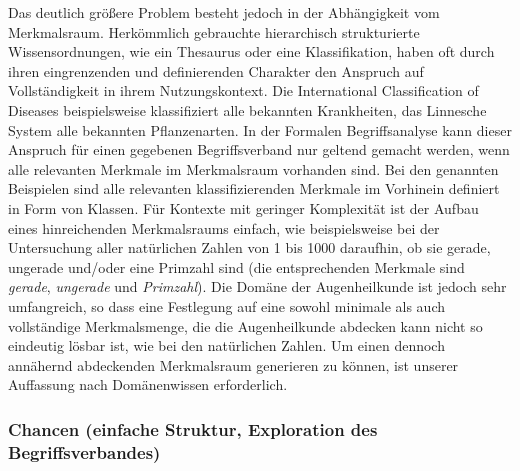 \documentclass[pagesize,DIV=calc,12pt,draft]{scrreprt}
\begin{document}
Das deutlich größere Problem besteht jedoch in der Abhängigkeit vom Merkmalsraum. 
Herkömmlich gebrauchte hierarchisch strukturierte Wissensordnungen, wie ein Thesaurus oder eine Klassifikation, haben oft durch ihren eingrenzenden und definierenden Charakter den Anspruch auf Vollständigkeit in ihrem Nutzungskontext. 
Die International Classification of Diseases beispielsweise klassifiziert alle bekannten Krankheiten, das Linnesche System alle bekannten Pflanzenarten. 
In der Formalen Begriffsanalyse kann dieser Anspruch für einen gegebenen Begriffsverband nur geltend gemacht werden, wenn alle relevanten Merkmale im Merkmalsraum vorhanden sind. 
Bei den genannten Beispielen sind alle relevanten klassifizierenden Merkmale im Vorhinein definiert in Form von Klassen. 
Für Kontexte mit geringer Komplexität ist der Aufbau eines hinreichenden Merkmalsraums einfach, wie beispielsweise bei der Untersuchung aller natürlichen Zahlen von 1 bis 1000 daraufhin, ob sie gerade, ungerade und/oder eine Primzahl sind (die entsprechenden Merkmale sind \emph{gerade}, \emph{ungerade} und \emph{Primzahl}).
Die Domäne der Augenheilkunde ist jedoch sehr umfangreich, so dass eine Festlegung auf eine sowohl minimale als auch vollständige Merkmalsmenge, die die Augenheilkunde abdecken kann nicht so eindeutig lösbar ist, wie bei den natürlichen Zahlen. 
Um einen dennoch annähernd abdeckenden Merkmalsraum generieren zu können, ist unserer Auffassung nach Domänenwissen erforderlich. 

\subsubsection{Chancen (einfache Struktur, Exploration des Begriffsverbandes)}
\end{document}

